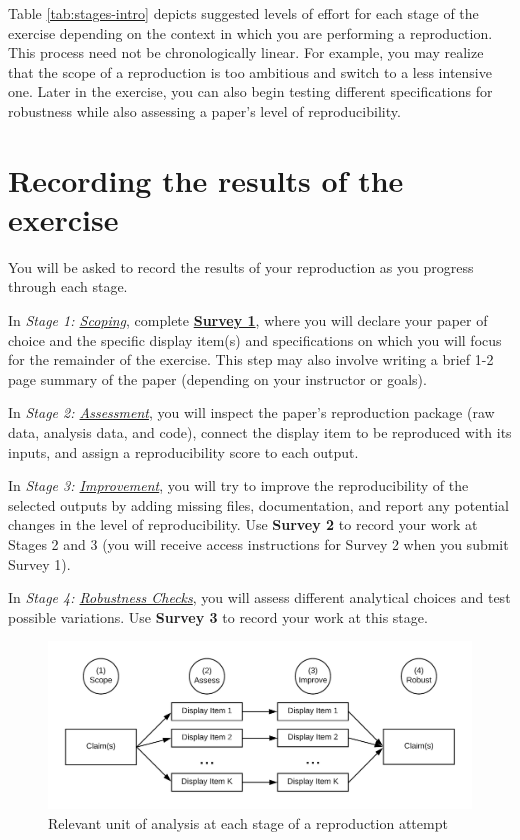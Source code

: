 \documentclass[]{book}
\begin{document}
Table \ref{tab:stages-intro} depicts suggested levels of effort for each stage of the exercise depending on the context in which you are performing a reproduction. This process need not be chronologically linear. For example, you may realize that the scope of a reproduction is too ambitious and switch to a less intensive one. Later in the exercise, you can also begin testing different specifications for robustness while also assessing a paper's level of reproducibility.

\hypertarget{recording-the-results-of-the-exercise}{%
\section*{Recording the results of the exercise}\label{recording-the-results-of-the-exercise}}

You will be asked to record the results of your reproduction as you progress through each stage.

In \emph{Stage 1: \protect\hyperlink{scoping}{Scoping}}, complete \textbf{\href{https://berkeley.qualtrics.com/jfe/form/SV_2bO83uJvU9ZiTXv}{Survey 1}}, where you will declare your paper of choice and the specific display item(s) and specifications on which you will focus for the remainder of the exercise. This step may also involve writing a brief 1-2 page summary of the paper (depending on your instructor or goals).

In \emph{Stage 2: \protect\hyperlink{assessment}{Assessment}}, you will inspect the paper's reproduction package (raw data, analysis data, and code), connect the display item to be reproduced with its inputs, and assign a reproducibility score to each output.

In \emph{Stage 3: \protect\hyperlink{improvements}{Improvement}}, you will try to improve the reproducibility of the selected outputs by adding missing files, documentation, and report any potential changes in the level of reproducibility. Use \textbf{Survey 2} to record your work at Stages 2 and 3 (you will receive access instructions for Survey 2 when you submit Survey 1).

In \emph{Stage 4: \protect\hyperlink{robust}{Robustness Checks}}, you will assess different analytical choices and test possible variations. Use \textbf{Survey 3} to record your work at this stage.

\begin{figure}
\includegraphics[width=1\linewidth]{unit-of-analysis} \caption{Relevant unit of analysis at each stage of a reproduction attempt}\label{fig:stages-unit}
\end{figure}
\end{document}
